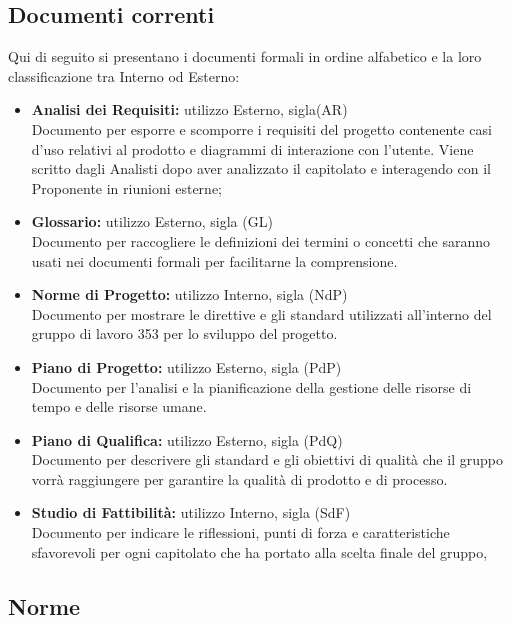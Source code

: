 \documentclass[NormeDiProgetto.tex]{subfiles}
\begin{document}
	\subsection{Documenti correnti}
	Qui di seguito si presentano i documenti formali in ordine alfabetico e la loro classificazione tra Interno od Esterno:
	\begin{itemize}
		\item \textbf{Analisi dei Requisiti:} utilizzo Esterno, sigla(AR) \\
		 Documento per esporre e scomporre i requisiti del progetto contenente casi d'uso relativi al prodotto e diagrammi di interazione con l'utente. Viene scritto dagli Analisti dopo aver analizzato il capitolato e interagendo con il Proponente in riunioni esterne;
		
		\item \textbf{Glossario:}
		utilizzo Esterno, sigla (GL) \\
		Documento per raccogliere le definizioni dei termini o concetti che saranno usati nei documenti formali per facilitarne la comprensione.
		
		\item \textbf{Norme di Progetto:}
		utilizzo Interno, sigla (NdP) \\
		Documento per mostrare le direttive e gli standard utilizzati all'interno del gruppo di lavoro 353
		per lo sviluppo del progetto.
		
		\item \textbf{Piano di Progetto:}
		utilizzo Esterno, sigla (PdP) \\
		Documento per l'analisi e la pianificazione della gestione delle risorse di tempo e delle risorse umane.
		
		\item \textbf{Piano di Qualifica:}
		utilizzo Esterno, sigla (PdQ) \\
		Documento per descrivere gli standard e gli obiettivi di qualità che il gruppo vorrà raggiungere per garantire la qualità di prodotto e di processo.
		
		\item \textbf{Studio di Fattibilità:}
		utilizzo Interno, sigla (SdF) \\
		Documento per indicare le riflessioni, punti di forza e caratteristiche sfavorevoli per ogni capitolato che ha portato alla scelta finale del gruppo, 
		
	\end{itemize}
	
	\subsection{Norme}
\end{document}
